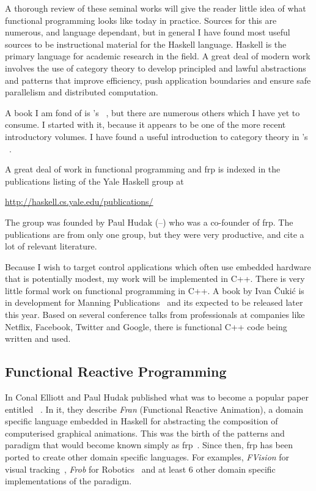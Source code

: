 A thorough review of these seminal works will give the reader little idea of
what functional programming looks like today in practice. Sources for this are
numerous, and language dependant, but in general I have found most useful
sources to be instructional material for the Haskell language. Haskell is the
primary language for academic research in the field. A great deal of modern work
involves the use of category theory to develop principled and lawful
abstractions and patterns that improve efficiency, push application boundaries
and ensure safe parallelism and distributed computation.

A book I am fond of is \citeauthor{Allen2016}'s
~\cite{Allen2016}, but there are numerous others which I
have yet to consume. I started with it, because it appears to be one of the more
recent introductory volumes. I have found a useful introduction to category
theory in \citeauthor{Spivak2014}'s ~\cite{Spivak2014}.

A great deal of work in functional programming and \ac{frp} is indexed in the
publications listing of the Yale Haskell group at \begin{center}
\url{http://haskell.cs.yale.edu/publications/} \end{center} The group was
founded by Paul Hudak (--) who was a co-founder of
\ac{frp}. The publications are from only one group, but they were very
productive, and cite a lot of relevant literature.

Because I wish to target control applications which often use embedded hardware
that is potentially modest, my work will be implemented in C++. There is very
little formal work on functional programming in C++. A book by Ivan Čukić is in
development for Manning Publications~\cite{Cukic2017} and its expected to be
released later this year. Based on several conference talks from professionals
at companies like Netflix, Facebook, Twitter and Google, there is functional C++
code being written and used.



\subsection{Functional Reactive Programming}


In  Conal Elliott and Paul Hudak published what was to become a
popular paper entitled ~\cite{Elliott1997a}. In it, they
describe \textit{Fran} (Functional Reactive Animation), a
domain specific language embedded in Haskell for abstracting the composition of
computerised graphical animations. This was the birth of the patterns and
paradigm that would become known simply as
\acf{frp}~\cite{Wan2000,Nilsson2002a}. Since then, \ac{frp} has been ported to
create other domain specific languages. For examples, \textit{FVision} for
visual tracking~\cite{Peterson2001b}, \textit{Frob} for
Robotics~\cite{PeHa99,phh99} and at least 6 other domain specific
implementations of the paradigm.

